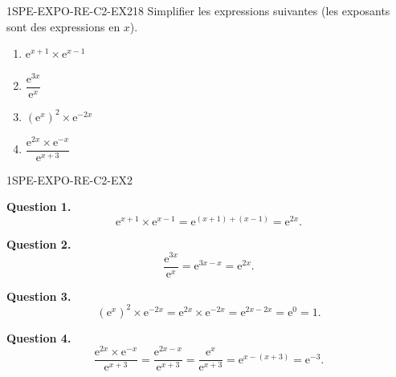 
\begin{exercice}{1SPE-EXPO-RE-C2-EX2}{1}{8}
Simplifier les expressions suivantes (les exposants sont des expressions en $x$).
\begin{enumerate}
  \item $\mathrm{e}^{x+1} \times \mathrm{e}^{x-1}$
  \item $\dfrac{\mathrm{e}^{3x}}{\mathrm{e}^{x}}$
  \item $\left(\mathrm{e}^{x}\right)^2 \times \mathrm{e}^{-2x}$
  \item $\dfrac{\mathrm{e}^{2x} \times \mathrm{e}^{-x}}{\mathrm{e}^{x+3}}$
\end{enumerate}
\end{exercice}



\begin{corrige}{1SPE-EXPO-RE-C2-EX2}

\textbf{Question 1.}
\[
\mathrm{e}^{x+1} \times \mathrm{e}^{x-1} = \mathrm{e}^{(x+1)+(x-1)} = \mathrm{e}^{2x}.
\]

\textbf{Question 2.}
\[
\frac{\mathrm{e}^{3x}}{\mathrm{e}^{x}} = \mathrm{e}^{3x - x} = \mathrm{e}^{2x}.
\]

\textbf{Question 3.}
\[
\left(\mathrm{e}^{x}\right)^2 \times \mathrm{e}^{-2x} = \mathrm{e}^{2x} \times \mathrm{e}^{-2x} = \mathrm{e}^{2x - 2x} = \mathrm{e}^0 = 1.
\]

\textbf{Question 4.}
\[
\frac{\mathrm{e}^{2x} \times \mathrm{e}^{-x}}{\mathrm{e}^{x+3}} = \frac{\mathrm{e}^{2x-x}}{\mathrm{e}^{x+3}} = \frac{\mathrm{e}^{x}}{\mathrm{e}^{x+3}} = \mathrm{e}^{x-(x+3)} = \mathrm{e}^{-3}.
\]

\end{corrige}



